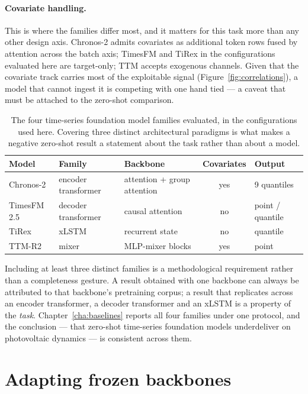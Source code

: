 \paragraph{Covariate handling.} This is where the families differ most, and it matters for
this task more than any other design axis. Chronos-2 admits covariates as additional token
rows fused by attention across the batch axis; TimesFM and TiRex in the configurations
evaluated here are target-only; TTM accepts exogenous channels. Given that the covariate
track carries most of the exploitable signal (Figure~\ref{fig:correlations}), a model that
cannot ingest it is competing with one hand tied --- a caveat that must be attached to the
zero-shot comparison.

\begin{table}[h!]
\centering
\small
\begin{tabular}{l l l c l}
\hline
\textbf{Model} & \textbf{Family} & \textbf{Backbone} & \textbf{Covariates} &
\textbf{Output} \\
\hline
Chronos-2 & encoder transformer & attention + group attention & yes & 9 quantiles \\
TimesFM 2.5 & decoder transformer & causal attention & no & point / quantile \\
TiRex & xLSTM & recurrent state & no & quantile \\
TTM-R2 & mixer & MLP-mixer blocks & yes & point \\
\hline
\end{tabular}
\caption{The four time-series foundation model families evaluated, in the configurations used
here. Covering three distinct architectural paradigms is what makes a negative zero-shot
result a statement about the task rather than about a model.}
\label{tab:tsfm-families}
\end{table}

Including at least three distinct families is a methodological requirement rather than a
completeness gesture. A result obtained with one backbone can always be attributed to that
backbone's pretraining corpus; a result that replicates across an encoder transformer, a
decoder transformer and an xLSTM is a property of the \emph{task}. Chapter~\ref{cha:baselines}
reports all four families under one protocol, and the conclusion --- that zero-shot
time-series foundation models underdeliver on photovoltaic dynamics --- is consistent
across them.

\section{Adapting frozen backbones}
\label{sec:adaptation}

